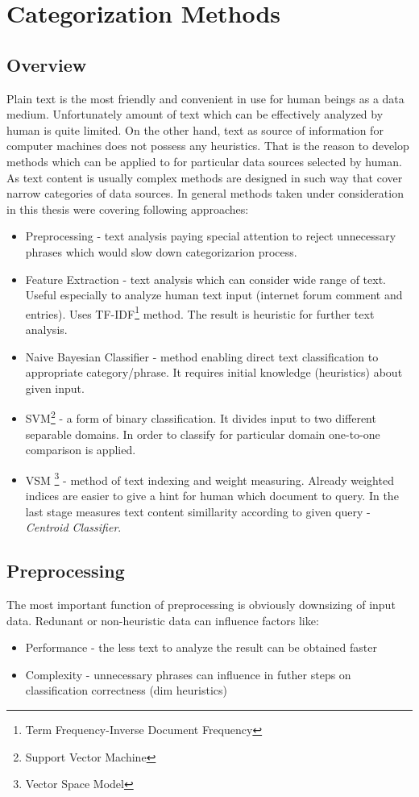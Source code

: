 \chapter{Categorization Methods}
\section{Overview}
Plain text is the most friendly and convenient in use for human beings as a data medium. Unfortunately amount of text which can be effectively analyzed by human is quite limited. On the other hand, text as source of information for computer machines does not possess any heuristics. That is the reason to develop methods which can be applied to for particular data sources selected by human. As text content is usually complex methods are designed in such way that cover narrow categories of data sources. In general methods taken under consideration in this thesis were covering following approaches:
\begin{itemize}
	\item Preprocessing - text analysis paying special attention to reject unnecessary phrases which would slow down categorizarion process.
	\item Feature Extraction - text analysis which can consider wide range of text. Useful especially to analyze human text input (internet forum comment and entries). Uses TF-IDF\footnote{Term Frequency-Inverse Document Frequency} method. The result is heuristic for further text analysis.
	\item Naive Bayesian Classifier - method enabling direct text classification to appropriate category/phrase. It requires initial knowledge (heuristics) about given input.
	\item SVM\footnote{Support Vector Machine} - a form of binary classification. It divides input to two different separable domains. In order to classify for particular domain one-to-one comparison is applied.
	\item VSM \footnote{Vector Space Model} - method of text indexing and weight measuring. Already weighted indices are easier to give a hint for human which document to query. In the last stage measures text content simillarity according to given query - \textit{Centroid Classifier}.
	       
\end{itemize}

\section{Preprocessing}
The most important function of preprocessing is obviously downsizing of input data. Redunant or non-heuristic data can influence factors like:
\begin{itemize}
	\item Performance - the less text to analyze the result can be obtained faster
	\item Complexity - unnecessary phrases can influence in futher steps on classification correctness (dim heuristics)
\end{itemize}

